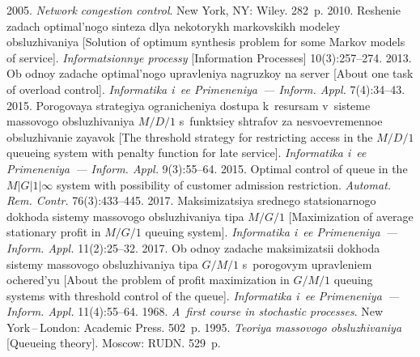 







  \begin{multicols}{2}

\renewcommand{\bibname}{\protect\rmfamily References}

{\small\frenchspacing
 {%
 \begin{thebibliography}{9}
 2005. 
\textit{Network congestion control}. New York, NY: Wiley. 282~p.
 2010. Reshenie zadach optimal'nogo 
sinteza dlya nekotorykh 
markovskikh modeley obsluzhivaniya [Solution of 
optimum synthesis problem for some Markov models of service]. 
\textit{Informatsionnye processy} [Information Processes] 
10(3):257--274.
 2013. 
Ob odnoy zadache optimal'nogo 
upravleniya nagruzkoy na server [About one task of overload 
control]. \textit{Informatika i~ee Primeneniya~--- Inform. Appl.} 7(4):34--43.
 2015. Porogovaya strategiya 
ogranicheniya dostupa k~resursam v~sisteme massovogo obsluzhivaniya 
$M/D/1$ s~funktsiey 
shtrafov za nesvoevremennoe obsluzhivanie zayavok 
[The threshold strategy 
for restricting access in the $M/D/1$ queueing system with penalty 
function for late service]. \textit{Informatika i~ee Primeneniya~--- Inform. Appl.}
9(3):55--64. 
 2015. 
Optimal control of queue in the $M|G|1|\infty$ 
system with possibility of customer admission restriction. 
\textit{Automat. Rem. Contr.} 76(3):433--445.
 2017. 
Maksimizatsiya srednego sta\-tsi\-o\-nar\-no\-go dokhoda sistemy massovogo obsluzhivaniya tipa 
$M/G/1$
[Maximization of average stationary profit in $M/G/1$ queuing system]. 
\textit{Informatika i~ee Primeneniya~--- Inform. Appl.} 11(2):25--32.
 2017. 
Ob odnoy zadache maksimizatsii dokhoda sistemy massovogo obsluzhivaniya
tipa $G/M/1$ s~porogovym upravleniem oche\-red'yu
[About the problem of profit maximization in $G/M/1$ queuing systems
with threshold control of the queue]. \textit{Informatika i~ee Primeneniya~--- 
Inform. Appl.} 11(4):55--64.
 1968. \textit{A~first course in stochastic processes}. 
New York\,--\,London: Academic Press. 502~p.
 1995. 
\textit{Teoriya massovogo obsluzhivaniya} [Queueing theory]. Moscow: RUDN. 529~p.
\end{thebibliography}

}}
\end{multicols}
